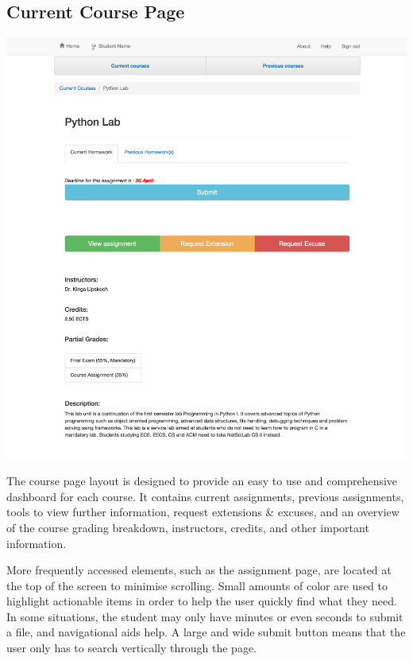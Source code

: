 \subsection{Current Course Page}

\includegraphics[width=\textwidth]{screenshots/PythonLab.png}

The course page layout is designed to provide an easy to use and comprehensive dashboard for each course. It contains current assignments, previous assignments, tools to view further information, request extensions \& excuses, and an overview of the course grading breakdown, instructors, credits, and other important information.

More frequently accessed elements, such as the assignment page, are located at the top of the screen to minimise scrolling. Small amounts of color are used to highlight actionable items in order to help the user quickly find what they need. In some situations, the student may only have minutes or even seconds to submit a file, and navigational aids help. A large and wide submit button means that the user only has to search vertically through the page.

